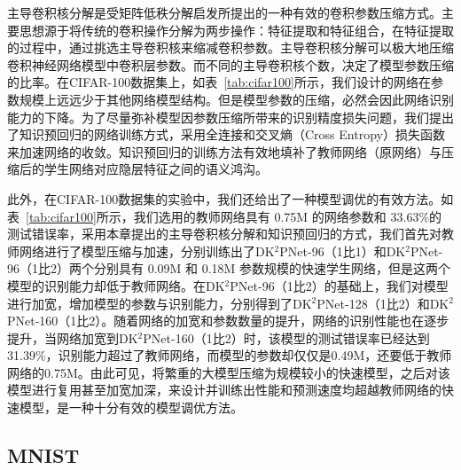 主导卷积核分解是受矩阵低秩分解启发所提出的一种有效的卷积参数压缩方式。主要思想源于将传统的卷积操作分解为两步操作：特征提取和特征组合，在特征提取的过程中，通过挑选主导卷积核来缩减卷积参数。主导卷积核分解可以极大地压缩卷积神经网络模型中卷积层参数。而不同的主导卷积核个数，决定了模型参数压缩的比率。在CIFAR-100数据集上，如表~\ref{tab:cifar100}所示，我们设计的网络在参数规模上远远少于其他网络模型结构。但是模型参数的压缩，必然会因此网络识别能力的下降。为了尽量弥补模型因参数压缩所带来的识别精度损失问题，我们提出了知识预回归的网络训练方式，采用全连接和交叉熵（Cross Entropy）损失函数来加速网络的收敛。知识预回归的训练方法有效地填补了教师网络（原网络）与压缩后的学生网络对应隐层特征之间的语义鸿沟。

此外，在CIFAR-100数据集的实验中，我们还给出了一种模型调优的有效方法。如表~\ref{tab:cifar100}所示，我们选用的教师网络具有 0.75M 的网络参数和 33.63\%的测试错误率，采用本章提出的主导卷积核分解和知识预回归的方式，我们首先对教师网络进行了模型压缩与加速，分别训练出了DK$^2$PNet-96（1比1）和DK$^2$PNet-96（1比2）两个分别具有 0.09M 和 0.18M 参数规模的快速学生网络，但是这两个模型的识别能力却低于教师网络。在DK$^2$PNet-96（1比2）的基础上，我们对模型进行加宽，增加模型的参数与识别能力，分别得到了DK$^2$PNet-128（1比2）和DK$^2$PNet-160（1比2）。随着网络的加宽和参数数量的提升，网络的识别性能也在逐步提升，当网络加宽到DK$^2$PNet-160（1比2）时，该模型的测试错误率已经达到31.39\%，识别能力超过了教师网络，而模型的参数却仅仅是0.49M，还要低于教师网络的0.75M。由此可见，将繁重的大模型压缩为规模较小的快速模型，之后对该模型进行复用甚至加宽加深，来设计并训练出性能和预测速度均超越教师网络的快速模型，是一种十分有效的模型调优方法。


\subsection{MNIST}
\label{sec:acc:experiment:mnist}

